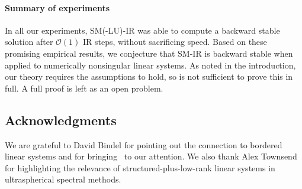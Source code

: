\documentclass{siamltex}
\begin{document}
\paragraph{Summary of experiments}
In all our experiments, SM(-LU)-IR was able to compute a backward stable solution after $\mathcal{O}(1)$ IR steps, without sacrificing speed. Based on these promising empirical results, we conjecture that SM-IR is backward stable when applied to numerically nonsingular linear systems. As noted in the introduction, our theory requires the assumptions to hold, so is not sufficient to prove this in full. A full proof is left as an open problem. 

\subsection*{Acknowledgments}
We are grateful to David Bindel for pointing out the connection to bordered linear systems and for bringing~\cite{Govaerts91} to our attention. We also thank Alex Townsend for highlighting the relevance of structured-plus-low-rank linear systems in ultraspherical spectral methods.

%
%

\newpage
\appendix
\end{document}

